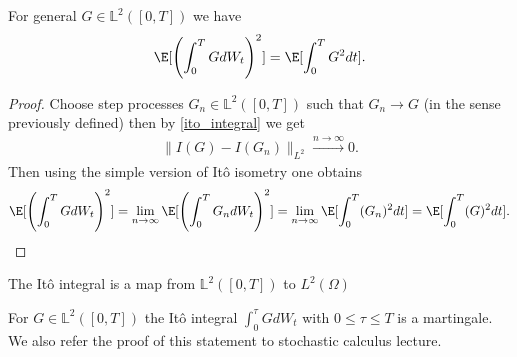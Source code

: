 \begin{lemma}[It\^o Isometry]
  For general $G \in  \mathbb{L}^2([0,T])$  we have 
  \begin{align*}
    \E[\left( \int_0^{T} G dW_t  \right)^2 ] = \E[\int_0^{T} G^2  dt ]
  .\end{align*}
\end{lemma}
\begin{proof}
  Choose step processes $G_{n} \in \mathbb{L}^2([0,T]) $  such that $G_{n} \to G $ (in the sense previously defined) then by \autoref{ito_integral} we get 
  \begin{align*}
    \|I(G) - I(G_n)\|_{L^2} \xrightarrow{n\to \infty} 0
  .\end{align*}
  Then using the simple version of It\^o isometry one obtains 
  \begin{align*}
    \E[\left(\int_0^{T} G dW_t\right)^2] = \lim_{n\to \infty} \E[\left( \int_0^{T} G_{n} dW_t   \right)^2 ]  = \lim_{n\to \infty} \E[\int_0^{T} (G_n)^2dt ] = \E[\int_0^{T} (G)^2dt ]
  .\end{align*}
\end{proof}
\begin{remark}
  The It\^o integral is a map from $\mathbb{L}^2([0,T]) $  to $L^2(\Omega )$
\end{remark}
\begin{remark}
  For $G \in \mathbb{L}^2([0,T])$  the It\^o integral $\int_0^{\tau } G dW_t $ with $0 \le \tau  \le T$ is a martingale. We also refer the proof of this statement to stochastic calculus lecture.
\end{remark}
